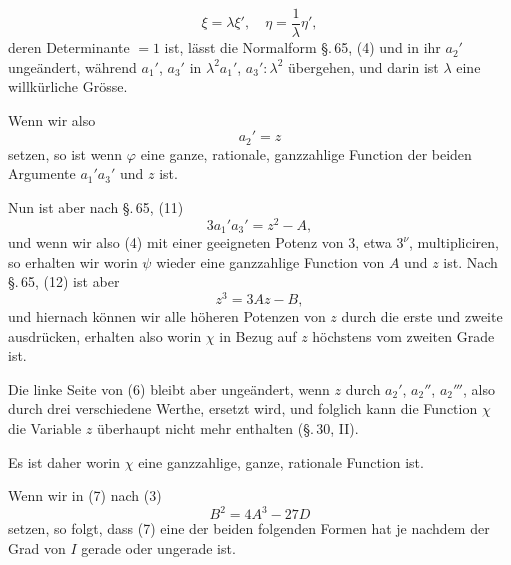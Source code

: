 \[
\xi = \lambda\xi', \quad \eta = \frac{1}{\lambda}\eta',
\]
deren Determinante $= 1$ ist, lässt die Normalform \S.\,65, (4) und in ihr
$a_2'$ ungeändert, während $a_1'$, $a_3'$ in $\lambda^2 a_1'$, $a_3' : \lambda^2$
übergehen, und darin ist $\lambda$ eine willkürliche Grösse.

Wenn wir also
\[
a_2' = z
\]
setzen, so ist
wenn $\varphi$ eine ganze, rationale, ganzzahlige Function der beiden
Argumente $a_1'a_3'$ und $z$ ist.

Nun ist aber nach \S.\,65, (11)
\[
3a_1'a_3' = z^2 - A,
\]
und wenn wir also (4) mit einer geeigneten Potenz von 3, etwa $3^\nu$,
multipliciren, so erhalten wir
worin $\psi$ wieder eine ganzzahlige Function von $A$ und $z$ ist. Nach
\S.\,65, (12) ist aber
\[
z^3 = 3Az - B,
\]
und hiernach können wir alle höheren Potenzen von $z$ durch die erste und
zweite ausdrücken, erhalten also
worin $\chi$ in Bezug auf $z$ höchstens vom zweiten Grade ist.

Die linke Seite von (6) bleibt aber ungeändert, wenn $z$ durch $a_2'$,
$a_2''$, $a_2'''$, also durch drei verschiedene Werthe, ersetzt wird, und
folglich kann die Function $\chi$ die Variable $z$ überhaupt nicht mehr
enthalten (\S.\,30, II).

Es ist daher
worin $\chi$ eine ganzzahlige, ganze, rationale Function ist.

Wenn wir in (7) nach (3)
\[
B^2 = 4A^3 - 27 D
\]
setzen, so folgt, dass (7) eine der beiden folgenden Formen hat
je nachdem der Grad von $I$ gerade oder ungerade ist.
